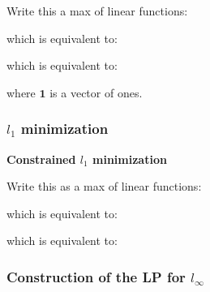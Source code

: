 \documentclass[8pt,a4paper]{scrartcl}
\begin{document}
\begin{multicols*}{3}

Write this a max of linear functions:


which is equivalent to:


which is equivalent to:


where $\mathbf{1}$ is a vector of ones.

\subsubsection{$l_1$ minimization}

\textbf{Constrained $l_1$ minimization}


Write this as a max of linear functions:


which is equivalent to:


which is equivalent to:


\subsubsection{Construction of the LP for $l_\infty$}


\end{multicols*}
\end{document}
